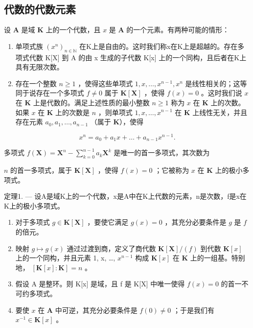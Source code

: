 \subsection{代数的代数元素}

设 \(\mathbf{A}\) 是域 \(\mathbf{K}\) 上的一个代数，且 \(x\) 是 \(\mathbf{A}\) 的一个元素。有两种可能的情形：

\begin{enumerate}
\def\labelenumi{\alph{enumi})}
\item
  单项式族 \((x^{n})_{n\in\mathbb{N}}\) 在K上是自由的。这时我们称x在K上是超越的。存在多项式代数 K{[}X{]} 到 A 的由 x 生成的子代数 K{[}x{]} 上的一个同构，且后者在K上具有无限次数。
\item
  存在一个整数 \(n \geqslant 1\) ，使得这些单项式 \(1, x, \ldots, x^{n-1}, x^n\) 是线性相关的；这等同于说存在一个多项式 \(f \neq 0\) 属于 \(\mathbf{K}[\mathbf{X}]\) ，使得 \(f(x) = 0\) 。这时我们说 \(x\) 在 \(\mathbf{K}\) 上是代数的。满足上述性质的最小整数 \(n \geqslant 1\) 称为 \(x\) 在 \(\mathbf{K}\) 上的次数。如果 \(x\) 在 \(\mathbf{K}\) 上的次数是 \(n\) ，则单项式 \(1, x, \ldots, x^{n-1}\) 在 \(\mathbf{K}\) 上线性无关，并且存在元素 \(a_0, a_1, \ldots, a_{n-1}\) （属于 \(\mathbf{K}\)），使得
\end{enumerate}

\[
x ^ {n} = a _ {0} + a _ {1} x + \dots + a _ {n - 1} x ^ {n - 1}.
\]

多项式 \(f(\mathbf{X}) = \mathbf{X}^n - \sum_{k=0}^{n-1} a_k \mathbf{X}^k\) 是唯一的首一多项式，其次数为

\(n\) 的首一多项式，属于 \(\mathbf{K}[\mathbf{X}]\) ，使得 \(f(x) = 0\) ；它被称为 \(x\) 在 \(\mathbf{K}\) 上的极小多项式。

定理1. --- 设A是域K上的一个代数，x是A中在K上代数的元素，n是次数，f是x在K上的极小多项式。

\begin{enumerate}
\def\labelenumi{\alph{enumi})}
\item
  对于多项式 \(g \in \mathbf{K}[\mathbf{X}]\) ，要使它满足 \(g(x) = 0\) ，其充分必要条件是 \(g\) 是 \(f\) 的倍元。
\item
  映射 \(g \mapsto g(x)\) 通过过渡到商，定义了商代数 \(\mathbf{K}[\mathbf{X}] / (f)\) 到代数 \(\mathbf{K}[x]\) 上的一个同构，并且元素 1, x, \ldots, \(x^{n-1}\) 构成 \(\mathbf{K}[x]\) 在 \(\mathbf{K}\) 上的一组基。特别地， \([\mathbf{K}[x]: \mathbf{K}] = n\) 。
\item
  假设 A 是整环。则 K{[}x{]} 是域，且 f 是 K{[}X{]} 中唯一使得 \(f(x) = 0\) 的首一不可约多项式。
\item
  要使 \(x\) 在 \(\mathbf{A}\) 中可逆，其充分必要条件是 \(f(0) \neq 0\) ；于是我们有 \(x^{-1} \in \mathbf{K}[x]\) 。
\end{enumerate}

